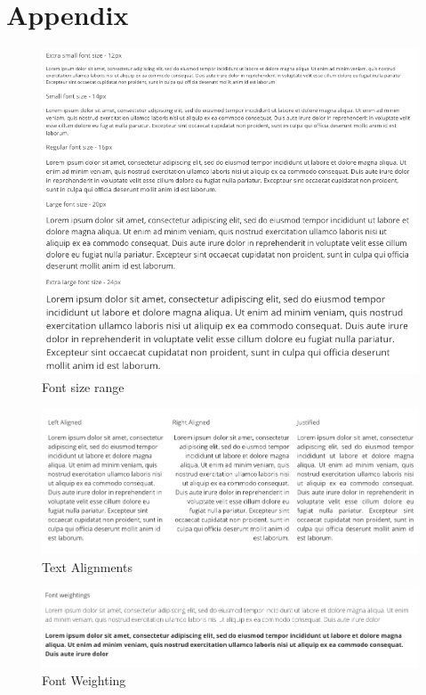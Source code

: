 \chapter*{Appendix}

\begin{figure}[h]
\caption{Font size range}
  \label{fig:fontSize}
\includegraphics[scale=0.4]{../public/images/fontsizes}
\centering
\end{figure}

\begin{figure}[h]
\caption{Text Alignments}
  \label{fig:textalign}
\includegraphics[scale=0.3]{../public/images/text-align}
\centering
\end{figure}

\begin{figure}[h]
\caption{Font Weighting}
  \label{fig:fontweight}
\includegraphics[scale=0.4]{../public/images/font-weighting}
\centering
\end{figure}

